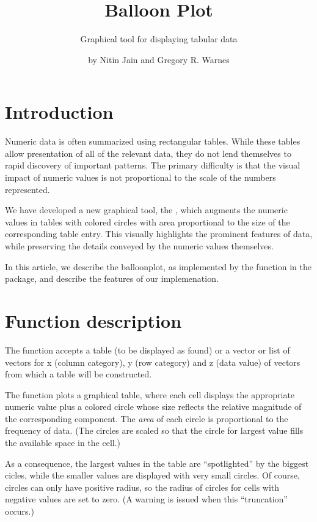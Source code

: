 \documentclass[a4paper]{report}
\begin{document}
\begin{article}
\author{by Nitin Jain and Gregory R. Warnes}
\title{Balloon Plot}
\subtitle{Graphical tool for displaying tabular data}

\maketitle

\section*{Introduction}

Numeric data is often summarized using rectangular tables. While
these tables allow presentation of all of the relevant data, they do
not lend themselves to rapid discovery of important patterns. The
primary difficulty is that the visual impact of numeric values is
not proportional to the scale of the numbers represented.

We have developed a new graphical tool, the ,
which augments the numeric values in tables with colored circles
with area proportional to the size of the corresponding table
entry. This visually highlights the prominent features of
data, while preserving the details conveyed by the numeric values
themselves.

In this article, we describe the balloonplot, as
implemented by the  function in the
 package, and describe the features of our
implemenation.


\section*{Function description}

The  function accepts a table (to be displayed as
found) or a vector or list of vectors for x (column category), y
(row category) and z (data value) of vectors from which a table will
be constructed.  

The  function plots a graphical table,
where each cell displays the appropriate numeric value plus a
colored circle whose size reflects the relative magnitude of the
corresponding component. The
\emph{area} of each circle is proportional to the frequency of
data. (The circles are scaled so that the circle for largest value
fills the available space in the cell.)


As a consequence, the largest values in the table are ``spotlighted''
by the biggest cicles, while the smaller values are displayed
with very small circles.  Of course, circles can only have positive
radius, so the radius of circles for cells with negative values are
set to zero.  (A warning is issued when this ``truncation'' occurs.)


\end{article}
\end{document}
